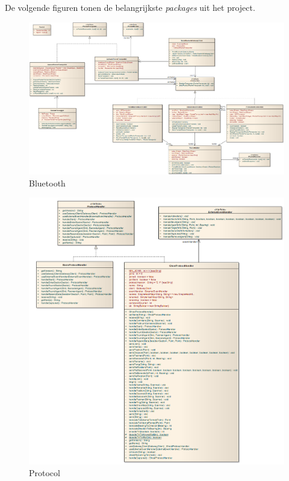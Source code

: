 \documentclass[12pt,a4paper]{report}
\begin{document}
De volgende figuren tonen de belangrijkste \emph{packages} uit het project.

\begin{figure}[htbp]
  \centering
  \includegraphics[width=200mm, angle=90]{resources/model-bluetooth2.png}
  \caption{Bluetooth}
  \label{uml:bluetooth}
\end{figure}

\begin{figure}[htbp]
  \centering
  \includegraphics[width=150mm]{resources/model-protocol2.png}
  \caption{Protocol}
  \label{uml:protocol}
\end{figure}
\end{document}
